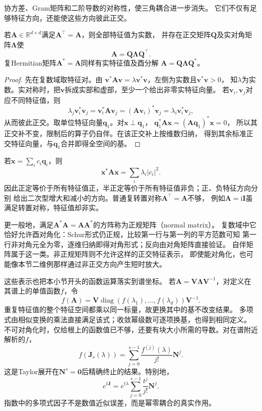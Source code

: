 协方差、Gram矩阵和二阶导数的对称性，使三角耦合进一步消失。
它们不仅有足够特征方向，还能使这些方向彼此正交。
\begin{theorem}[自伴矩阵的谱定理]
\label{thm:matrix-analysis-symmetric-spectral-theorem}
若$\bm A\in\mathbb R^{d\times d}$满足$\bm A^\top=\bm A$，则全部特征值为实数，
并存在正交矩阵$\bm Q$及实对角矩阵$\bm\Lambda$使
\begin{equation}
 \bm A=\bm Q\bm\Lambda\bm Q^\top.
 \label{eq:matrix-analysis-symmetric-eigendecomposition}
\end{equation}
复Hermitian矩阵$\bm A^*=\bm A$同样有实特征值及酉分解
$\bm A=\bm Q\bm\Lambda\bm Q^*$。
\end{theorem}
\begin{proof}
先在复数域取特征对。由
$\bm v^*\bm A\bm v=\lambda\bm v^*\bm v$，左侧为实数且$\bm v^*\bm v>0$，
知$\lambda$为实数。实对称时，把$\bm v$拆成实部和虚部，至少一个给出非零实特征向量。
若$\bm v_i,\bm v_j$对应不同特征值，则
\[
 \lambda_j\bm v_i^*\bm v_j
 =\bm v_i^*\bm A\bm v_j
 =(\bm A\bm v_i)^*\bm v_j
 =\lambda_i\bm v_i^*\bm v_j,
\]
从而彼此正交。取单位特征向量$\bm q_1$。对$\bm x\perp\bm q_1$，
$\bm q_1^*\bm A\bm x=(\bm A\bm q_1)^*\bm x=0$，
所以其正交补不变，限制后的算子仍自伴。在该正交补上按维数归纳，
得到其余标准正交特征向量，与$\bm q_1$合并即得全空间的基。
\end{proof}

若$\bm x=\sum_i c_i\bm q_i$，则
\begin{equation}
 \bm x^*\bm A\bm x=\sum_i\lambda_i|c_i|^2.
 \label{eq:matrix-analysis-quadratic-spectral-form}
\end{equation}
因此正定等价于所有特征值正，半正定等价于所有特征值非负；正、负特征方向分别
给出二次型增大和减小的方向。普通复转置对称$\bm A^\top=\bm A$不够，
例如$\bm A=\mathrm i\bm I$虽满足转置对称，特征值却非实。

更一般地，满足$\bm A^*\bm A=\bm A\bm A^*$的方阵称为正规矩阵（normal matrix）。
复数域中它恰好允许酉对角化：Schur形式仍正规，比较第一行与第一列的平方范数可知
第一行非对角元全为零，逐维归纳即得对角形式；反向由对角矩阵直接验证。
自伴矩阵属于这一类。非正规矩阵则不允许这样的正交特征表示，
即使能对角化，也可能像本节二维例那样通过非正交方向产生短时放大。

这些表示也把本小节开头的函数运算落实到谱坐标。
若$\bm A=\bm V\bm\Lambda\bm V^{-1}$，对定义在其谱上的单值函数$f$，令
\begin{equation}
 f(\bm A)=\bm V\operatorname{diag}(f(\lambda_1),\ldots,f(\lambda_d))\bm V^{-1}.
 \label{eq:matrix-analysis-matrix-function-diagonalizable}
\end{equation}
重复特征值的整个特征空间都乘以同一标量，故更换其中的基不改变结果。
多项式由相似变换的乘法直接满足该式；收敛幂级数可逐项换基，也得到相同定义。
不可对角化时，仅给根上的函数值已不够，还要有块大小所需的导数。对在谱附近解析的$f$，
\begin{equation}
 f(\bm J_s(\lambda))
 =\sum_{j=0}^{s-1}\frac{f^{(j)}(\lambda)}{j!}\bm N^j.
 \label{eq:ch06-jordan-function}
\end{equation}
这是Taylor展开在$\bm N^s=\bm0$后精确终止的结果。特别地，
\[
 e^{t\bm J}=e^{t\lambda}\sum_{j=0}^{s-1}\frac{t^j}{j!}\bm N^j.
\]
指数中的多项式因子不是数值近似误差，而是幂零耦合的真实作用。

